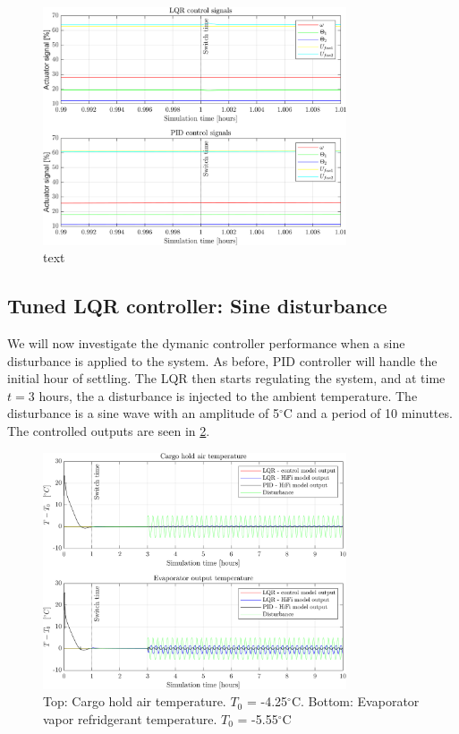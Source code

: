 \begin{figure}[H]
	\centering
	\includegraphics[width=0.8\textwidth]{Graphics/fig_inputs_noDist_zoom.png}
	\caption{text}
	\label{fig:inputs_noDist_zoom}
\end{figure}

\newpage
\subsection{Tuned LQR controller: Sine disturbance}
We will now investigate the dymanic controller performance when a sine disturbance is applied to the system. As before, PID controller will handle the initial hour of settling. The LQR then starts regulating the system, and at time $t=3$ hours, the a disturbance is injected to the ambient temperature. The disturbance is a sine wave with an amplitude of 5$^{\circ}$C and a period of 10 minuttes. The controlled outputs are seen in \cref{fig:LQR_wellTuned_sineDist}.\\


\begin{figure}[H]
	\centering
	\includegraphics[width=0.8\textwidth]{Graphics/fig_LQRvsKresten_sineDist.png}
	\caption{Top: Cargo hold air temperature. $T_0$ = -4.25$^{\circ}$C. Bottom: Evaporator vapor refridgerant temperature. $T_0$ = -5.55$^{\circ}$C}
	\label{fig:LQR_wellTuned_sineDist}
\end{figure}

